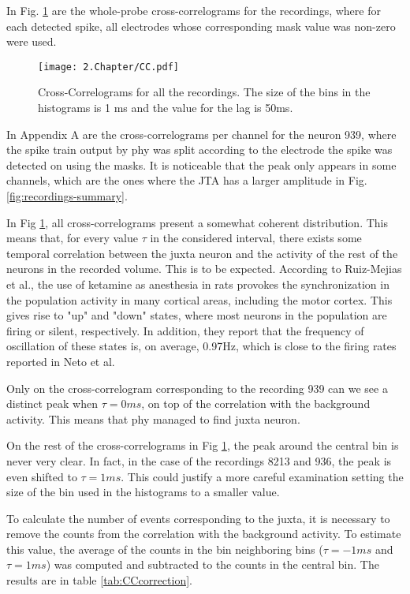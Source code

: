 In Fig. \ref{fig:CC} are the whole-probe cross-correlograms for the recordings, where for each detected spike, all electrodes whose corresponding mask value was non-zero were used.

\begin{figure}[!h]
	\centering
	\texttt{[image: 2.Chapter/CC.pdf]}
	\caption{Cross-Correlograms for all the recordings. The size of the bins in the histograms is 1 ms and the value for the lag is 50ms.
}
\label{fig:CC}
\end{figure}

In Appendix A are the cross-correlograms per channel for the neuron 939, where the spike train output by phy was split according to the electrode the spike was detected on using the masks. It is noticeable that the peak only appears in some channels, which are the ones where the JTA has a larger amplitude in Fig. \ref{fig:recordings-summary}.

In Fig \ref{fig:CC}, all cross-correlograms present a somewhat coherent distribution. This means that, for every value $\tau$ in the considered interval, there exists some temporal correlation between the juxta neuron and the activity of the rest of the neurons in the recorded volume. This is to be expected. According to Ruiz-Mejias et al., the use of ketamine as anesthesia in rats provokes the synchronization in the population activity in many cortical areas, including the motor cortex. This gives rise to "up" and "down" states, where most neurons in the population are firing or silent, respectively. In addition, they report that the frequency of oscillation of these states is, on average, 0.97Hz, which is close to the firing rates reported in Neto et al. 

Only on the cross-correlogram corresponding to the recording 939 can we see a distinct peak when $\tau=0 ms$, on top of the correlation with the background activity. This means that phy managed to find juxta neuron.

On the rest of the cross-correlograms in Fig \ref{fig:CC}, the peak around the central bin is never very clear. In fact, in the case of the recordings 8213 and 936, the peak is even shifted to $\tau=1 ms$. This could justify a more careful examination setting the size of the bin used in the histograms to a smaller value.

To calculate the number of events corresponding to the juxta, it is necessary to remove the counts from the correlation with the background activity. To estimate this value, the average of the counts in the bin neighboring bins ($\tau = -1ms$ and $\tau = 1 ms$) was computed and subtracted to the counts in the central bin. The results are in table \ref{tab:CCcorrection}.

